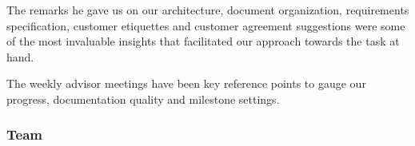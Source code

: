 The remarks he gave us on our architecture, document organization, requirements specification, customer etiquettes and customer agreement suggestions were some of the most invaluable insights that facilitated our approach towards the task at hand. 

The weekly advisor meetings have been key reference points to gauge our progress, documentation quality and milestone settings.
	\subsubsection{Team}
	


